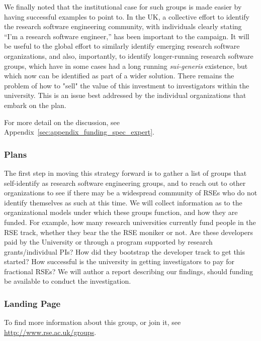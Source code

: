 We finally noted that the institutional case for such groups is made easier by having successful examples to point to. In the
UK, a collective effort to identify the research software engineering community, with individuals clearly stating ``I'm a research software engineer,'' has been important to the campaign. It will be useful to the global effort to similarly identify emerging research software organizations, and also, importantly, to identify longer-running research software groups, which have in some cases had a long running \emph{sui-generis} existence, but which now can be identified as part of a wider solution. There remains the problem of how to "sell" the value of this investment to investigators within the university. This is an issue best addressed by the individual organizations that embark on the plan. 

For more detail on the discussion, see Appendix~\ref{sec:appendix_funding_spec_expert}.

\subsubsection{Plans}

The first step in moving this strategy forward is to gather a list of groups that self-identify as research software engineering groups, and to reach out to other organizations to see if there may be a widespread community of RSEs who do not identify themselves as such at this time. We will collect information as to the organizational models under which these groups function, and how they are funded. For example, how many research universities currently fund people in the RSE track, whether they bear the the RSE moniker or not. Are these developers paid by the University or through a program supported by research grants/individual PIs? How did they bootstrap the developer track to get this started? How successful is the university in getting investigators to pay for fractional RSEs?  We will author a report describing our findings, should funding be available to conduct the investigation. 

\subsubsection{Landing Page}

To find more information about this group, or join it, see \url{http://www.rse.ac.uk/groups}.
